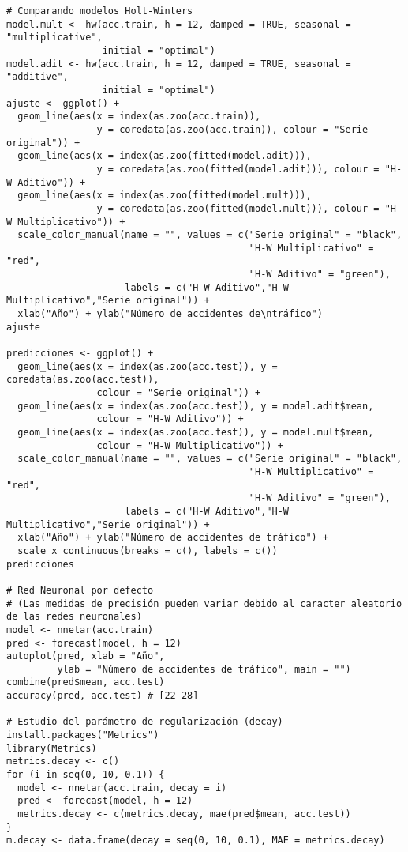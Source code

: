 \documentclass[12pt,a4paper,oneside]{article}
\begin{document}
\begin{Verbatim}[fontsize=\footnotesize]
# Comparando modelos Holt-Winters
model.mult <- hw(acc.train, h = 12, damped = TRUE, seasonal = "multiplicative",
                 initial = "optimal")
model.adit <- hw(acc.train, h = 12, damped = TRUE, seasonal = "additive",
                 initial = "optimal")
ajuste <- ggplot() +
  geom_line(aes(x = index(as.zoo(acc.train)),
                y = coredata(as.zoo(acc.train)), colour = "Serie original")) +
  geom_line(aes(x = index(as.zoo(fitted(model.adit))),
                y = coredata(as.zoo(fitted(model.adit))), colour = "H-W Aditivo")) +
  geom_line(aes(x = index(as.zoo(fitted(model.mult))),
                y = coredata(as.zoo(fitted(model.mult))), colour = "H-W Multiplicativo")) +
  scale_color_manual(name = "", values = c("Serie original" = "black",
                                           "H-W Multiplicativo" = "red",
                                           "H-W Aditivo" = "green"),
                     labels = c("H-W Aditivo","H-W Multiplicativo","Serie original")) +
  xlab("Año") + ylab("Número de accidentes de\ntráfico")
ajuste

predicciones <- ggplot() +
  geom_line(aes(x = index(as.zoo(acc.test)), y = coredata(as.zoo(acc.test)),
                colour = "Serie original")) +
  geom_line(aes(x = index(as.zoo(acc.test)), y = model.adit$mean,
                colour = "H-W Aditivo")) +
  geom_line(aes(x = index(as.zoo(acc.test)), y = model.mult$mean,
                colour = "H-W Multiplicativo")) +
  scale_color_manual(name = "", values = c("Serie original" = "black",
                                           "H-W Multiplicativo" = "red",
                                           "H-W Aditivo" = "green"),
                     labels = c("H-W Aditivo","H-W Multiplicativo","Serie original")) +
  xlab("Año") + ylab("Número de accidentes de tráfico") +
  scale_x_continuous(breaks = c(), labels = c())
predicciones

# Red Neuronal por defecto
# (Las medidas de precisión pueden variar debido al caracter aleatorio de las redes neuronales)
model <- nnetar(acc.train)
pred <- forecast(model, h = 12)
autoplot(pred, xlab = "Año",
         ylab = "Número de accidentes de tráfico", main = "")
combine(pred$mean, acc.test)
accuracy(pred, acc.test) # [22-28]

# Estudio del parámetro de regularización (decay)
install.packages("Metrics")
library(Metrics)
metrics.decay <- c()
for (i in seq(0, 10, 0.1)) {
  model <- nnetar(acc.train, decay = i)
  pred <- forecast(model, h = 12)
  metrics.decay <- c(metrics.decay, mae(pred$mean, acc.test))
}
m.decay <- data.frame(decay = seq(0, 10, 0.1), MAE = metrics.decay)


\end{Verbatim}
\end{document}
